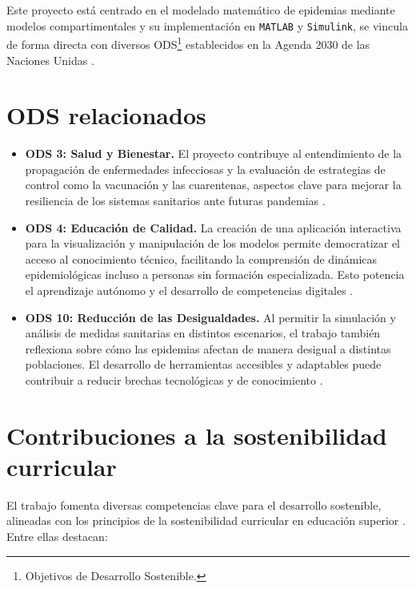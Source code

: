 
Este proyecto está centrado en el modelado matemático de epidemias mediante modelos compartimentales y su implementación en \texttt{MATLAB} y \texttt{Simulink}, se vincula de forma directa con diversos ODS\footnote{Objetivos de Desarrollo Sostenible.} establecidos en la Agenda 2030 de las Naciones Unidas \cite{onu2015agenda2030}.

\section*{ODS relacionados}

\begin{itemize}
    \item \textbf{ODS 3: Salud y Bienestar.} El proyecto contribuye al entendimiento de la propagación de enfermedades infecciosas y la evaluación de estrategias de control como la vacunación y las cuarentenas, aspectos clave para mejorar la resiliencia de los sistemas sanitarios ante futuras pandemias \cite{who2020disorder}.
    
    \item \textbf{ODS 4: Educación de Calidad.} La creación de una aplicación interactiva para la visualización y manipulación de los modelos permite democratizar el acceso al conocimiento técnico, facilitando la comprensión de dinámicas epidemiológicas incluso a personas sin formación especializada. Esto potencia el aprendizaje autónomo y el desarrollo de competencias digitales \cite{unesco2020education}.
    
    \item \textbf{ODS 10: Reducción de las Desigualdades.} Al permitir la simulación y análisis de medidas sanitarias en distintos escenarios, el trabajo también reflexiona sobre cómo las epidemias afectan de manera desigual a distintas poblaciones. El desarrollo de herramientas accesibles y adaptables puede contribuir a reducir brechas tecnológicas y de conocimiento \cite{who2021inequality}.
\end{itemize}

\section*{Contribuciones a la sostenibilidad curricular}

El trabajo fomenta diversas competencias clave para el desarrollo sostenible, alineadas con los principios de la sostenibilidad curricular en educación superior \cite{lozano2017teaching}. Entre ellas destacan:

